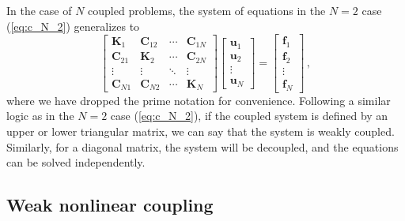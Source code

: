  In the case of $N$ coupled problems, the system of equations in the $N=2$ case (\eqref{eq:c_N_2}) generalizes to
    \begin{equation} \label{eq:multiphysics_strong}
        \begin{bmatrix}
 \mathbf{K}_1    & \mathbf{C}_{12} & \cdots & \mathbf{C}_{1N} \\
 \mathbf{C}_{21} & \mathbf{K}_2    & \cdots & \mathbf{C}_{2N} \\
            \vdots          & \vdots          & \ddots & \vdots          \\
 \mathbf{C}_{N1} & \mathbf{C}_{N2} & \cdots & \mathbf{K}_N
        \end{bmatrix}
        \begin{bmatrix}
 \mathbf{u}_1 \\
 \mathbf{u}_2 \\
            \vdots       \\
 \mathbf{u}_N
        \end{bmatrix}
 =
        \begin{bmatrix}
 \mathbf{f}_1 \\
 \mathbf{f}_2 \\
            \vdots       \\
 \mathbf{f}_N
        \end{bmatrix}\,,
    \end{equation}
 where we have dropped the prime notation for convenience. Following a similar logic as in the $N=2$ case (\eqref{eq:c_N_2}), if
 the coupled
 system is defined by an upper or lower triangular matrix, we can say that the
 system is weakly coupled. 
 Similarly, for a diagonal matrix, the system will be decoupled, and the equations can be
 solved independently.

 \subsection*{Weak nonlinear coupling}


